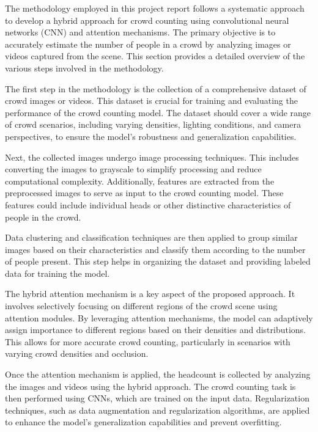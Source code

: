 \documentclass[12pt]{report}
\begin{document}
The methodology employed in this project report follows a systematic approach to develop a hybrid approach for crowd counting using convolutional neural networks (CNN) and attention mechanisms. The primary objective is to accurately estimate the number of people in a crowd by analyzing images or videos captured from the scene. This section provides a detailed overview of the various steps involved in the methodology.
\newline

The first step in the methodology is the collection of a comprehensive dataset of crowd images or videos. This dataset is crucial for training and evaluating the performance of the crowd counting model. The dataset should cover a wide range of crowd scenarios, including varying densities, lighting conditions, and camera perspectives, to ensure the model's robustness and generalization capabilities.
\newline

Next, the collected images undergo image processing techniques. This includes converting the images to grayscale to simplify processing and reduce computational complexity. Additionally, features are extracted from the preprocessed images to serve as input to the crowd counting model. These features could include individual heads or other distinctive characteristics of people in the crowd.
\newline

Data clustering and classification techniques are then applied to group similar images based on their characteristics and classify them according to the number of people present. This step helps in organizing the dataset and providing labeled data for training the model.
\newline

The hybrid attention mechanism is a key aspect of the proposed approach. It involves selectively focusing on different regions of the crowd scene using attention modules. By leveraging attention mechanisms, the model can adaptively assign importance to different regions based on their densities and distributions. This allows for more accurate crowd counting, particularly in scenarios with varying crowd densities and occlusion.
\newline

Once the attention mechanism is applied, the headcount is collected by analyzing the images and videos using the hybrid approach. The crowd counting task is then performed using CNNs, which are trained on the input data. Regularization techniques, such as data augmentation and regularization algorithms, are applied to enhance the model's generalization capabilities and prevent overfitting.
\newline
\end{document}
